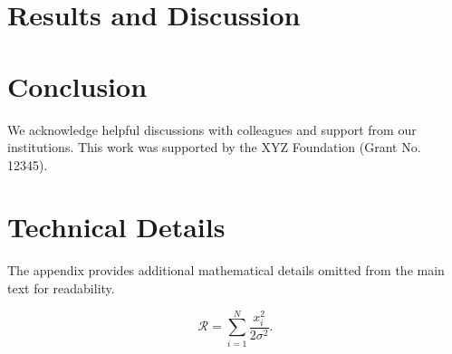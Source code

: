 \documentclass[%
 reprint,
 amsmath,amssymb,
 aps,
 floatfix,
]{revtex4-2}
\begin{document}
\section{Results and Discussion}

\section{Conclusion}

\begin{acknowledgments}
We acknowledge helpful discussions with colleagues and support from our institutions. This work was supported by the XYZ Foundation (Grant No. 12345).
\end{acknowledgments}

\appendix
\section{Technical Details}

The appendix provides additional mathematical details omitted from the main text for readability.

\begin{equation}
\mathcal{R} = \sum_{i=1}^N \frac{x_i^2}{2\sigma^2}.
\label{eq:appendix_eq}
\end{equation}


\end{document}
